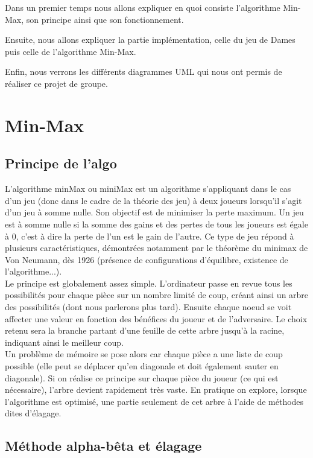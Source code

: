 \documentclass[12,french]{report}
\begin{document}
Dans un premier temps nous allons expliquer en quoi consiste l'algorithme Min-Max, son principe ainsi que son fonctionnement.


Ensuite, nous allons expliquer la partie implémentation, celle du jeu de Dames puis celle de l'algorithme Min-Max.


Enfin, nous verrons les différents diagrammes UML qui nous ont permis de réaliser ce projet de groupe.


\chapter{Min-Max}

\section{Principe de l'algo}

L'algorithme minMax ou miniMax est un algorithme s'appliquant dans le cas d'un jeu (donc dans le cadre de la théorie des jeu) à deux joueurs lorsqu'il s'agit d'un jeu à somme nulle. Son objectif est de minimiser la perte maximum. Un jeu est à somme nulle si la somme des gains et des pertes de tous les joueurs est égale à 0, c'est à dire la perte de l'un est le gain de l'autre. Ce type de jeu répond à plusieurs caractéristiques, démontrées notamment par le théorème du minimax de Von Neumann, dès 1926 (présence de configurations d'équilibre, existence de l'algorithme...).\\

Le principe est globalement assez simple. L'ordinateur passe en revue
tous les possibilités pour chaque pièce sur un nombre limité de coup,
créant ainsi un arbre des possibilités (dont nous parlerons plus tard). Ensuite chaque noeud se voit
affecter une valeur en fonction des bénéfices du joueur et de l'adversaire.
Le choix retenu sera la branche partant d'une feuille de cette arbre
jusqu'à la racine, indiquant ainsi le meilleur coup. \\

Un problème de mémoire se pose alors car chaque pièce a une liste de coup possible (elle peut se déplacer qu'en diagonale et doit également sauter en diagonale). Si on réalise ce principe sur chaque pièce du joueur (ce qui est nécessaire), l'arbre devient rapidement très vaste. En pratique on explore, lorsque l'algorithme est optimisé,
une partie seulement de cet arbre à l'aide de méthodes dites d'élagage.

\section{Méthode alpha-bêta et élagage}
\end{document}
